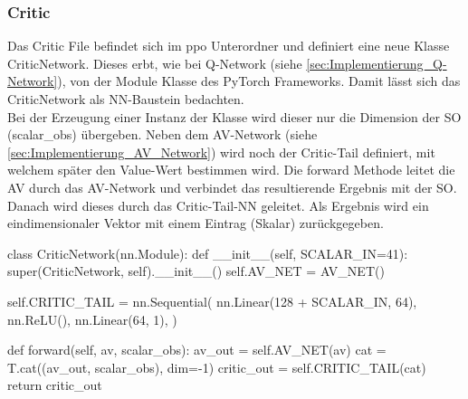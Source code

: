 \subsubsection{Critic}
Das Critic File befindet sich im ppo Unterordner und definiert eine neue Klasse CriticNetwork. Dieses erbt, wie bei Q-Network (siehe \ref{sec:Implementierung_Q-Network}), von der Module Klasse des PyTorch Frameworks. Damit lässt sich das CriticNetwork als NN-Baustein bedachten.\\
Bei der Erzeugung einer Instanz der Klasse wird dieser nur die Dimension der SO (scalar\_obs) übergeben.
Neben dem AV-Network (siehe \ref{sec:Implementierung_AV_Network}) wird noch der Critic-Tail definiert, mit welchem später den Value-Wert bestimmen wird. Die forward Methode leitet die AV durch das AV-Network und verbindet das resultierende Ergebnis mit der SO. Danach wird dieses durch das Critic-Tail-NN geleitet. Als Ergebnis wird ein eindimensionaler Vektor mit einem Eintrag (Skalar) zurückgegeben.
\begin{python}
	class CriticNetwork(nn.Module):
		def __init__(self, SCALAR_IN=41):
			super(CriticNetwork, self).__init__()
			self.AV_NET = AV_NET()
			
			self.CRITIC_TAIL = nn.Sequential(
				nn.Linear(128 + SCALAR_IN, 64),
				nn.ReLU(),
				nn.Linear(64, 1),
			)
		
		def forward(self, av, scalar_obs):
			av_out = self.AV_NET(av)
			cat = T.cat((av_out, scalar_obs), dim=-1)
			critic_out = self.CRITIC_TAIL(cat)
			return critic_out
\end{python}

